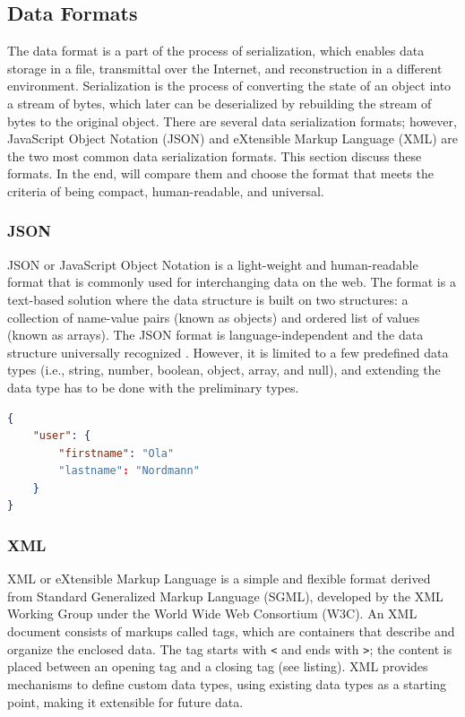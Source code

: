 \subsection{Data Formats} \label{sec:dataformat}

The data format is a part of the process of serialization, which enables data storage in a file, transmittal over the Internet, and reconstruction in a different environment. Serialization is the process of converting the state of an object into a stream of bytes, which later can be deserialized by rebuilding the stream of bytes to the original object. There are several data serialization formats; however, JavaScript Object Notation (JSON) and eXtensible Markup Language (XML) are the two most common data serialization formats. This section discuss these formats. In the end, will compare them and choose the format that meets the criteria of being compact, human-readable, and universal. 

\subsubsection{JSON}
JSON or JavaScript Object Notation is a light-weight and human-readable format that is commonly used for interchanging data on the web. The format is a text-based solution where the data structure is built on two structures: a collection of name-value pairs (known as objects) and ordered list of values (known as arrays). The JSON format is language-independent and the data structure universally recognized \cite{jsonorg, jsonvxml}. However, it is limited to a few predefined data types (i.e., string, number, boolean, object, array, and null), and extending the data type has to be done with the preliminary types. 

\begin{lstlisting}[language=json, caption={My Caption}, captionpos=b]
{
    "user": {
        "firstname": "Ola"
        "lastname": "Nordmann"
    }
}
\end{lstlisting}

\subsubsection{XML}
XML or eXtensible Markup Language is a simple and flexible format derived from Standard Generalized Markup Language (SGML), developed by the XML Working Group under the World Wide Web Consortium (W3C). An XML document consists of markups called tags, which are containers that describe and organize the enclosed data. The tag starts with \verb|<| and ends with \verb|>|; the content is placed between an opening tag and a closing tag (see listing). \cite{w3xml, jsonvxml} XML provides mechanisms to define custom data types, using existing data types as a starting point, making it extensible for future data. 

